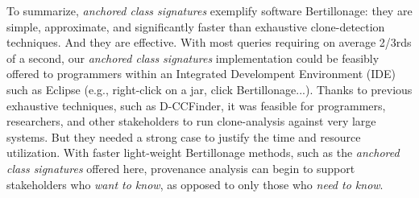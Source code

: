 To summarize, \emph{anchored class signatures} exemplify software Bertillonage:
they are simple, approximate, and significantly faster than exhaustive clone-detection
techniques.   And they are effective.  With most queries requiring on average 2/3rds of a second,
our \emph{anchored class signatures} implementation could be feasibly offered to programmers
within an Integrated Develompent Environment (IDE) such as Eclipse (e.g., right-click on a jar,  click Bertillonage...).
Thanks to previous exhaustive techniques, such as D-CCFinder, it was feasible for programmers,
researchers, and other stakeholders to
run clone-analysis against very large systems.  But they needed a strong case to justify the
time and resource utilization.  With faster light-weight Bertillonage methods, such as
the \emph{anchored class signatures} offered here, provenance analysis
can begin to support stakeholders who \emph{want to know}, as opposed to only those who \emph{need to know}.








